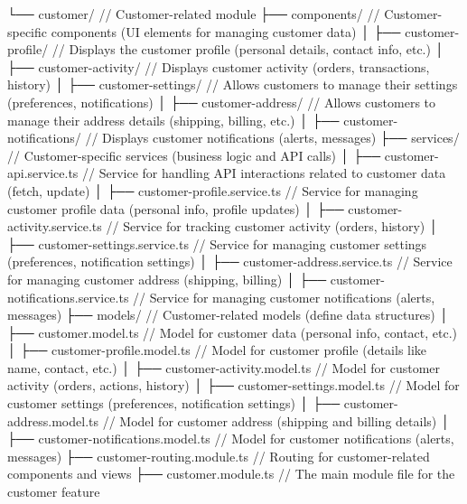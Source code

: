         └── customer/                            // Customer-related module
            ├── components/                       // Customer-specific components (UI elements for managing customer data)
            │   ├── customer-profile/             // Displays the customer profile (personal details, contact info, etc.)
            │   ├── customer-activity/            // Displays customer activity (orders, transactions, history)
            │   ├── customer-settings/            // Allows customers to manage their settings (preferences, notifications)
            │   ├── customer-address/             // Allows customers to manage their address details (shipping, billing, etc.)
            │   ├── customer-notifications/       // Displays customer notifications (alerts, messages)
            ├── services/                          // Customer-specific services (business logic and API calls)
            │   ├── customer-api.service.ts       // Service for handling API interactions related to customer data (fetch, update)
            │   ├── customer-profile.service.ts   // Service for managing customer profile data (personal info, profile updates)
            │   ├── customer-activity.service.ts  // Service for tracking customer activity (orders, history)
            │   ├── customer-settings.service.ts  // Service for managing customer settings (preferences, notification settings)
            │   ├── customer-address.service.ts   // Service for managing customer address (shipping, billing)
            │   ├── customer-notifications.service.ts // Service for managing customer notifications (alerts, messages)
            ├── models/                            // Customer-related models (define data structures)
            │   ├── customer.model.ts             // Model for customer data (personal info, contact, etc.)
            │   ├── customer-profile.model.ts     // Model for customer profile (details like name, contact, etc.)
            │   ├── customer-activity.model.ts    // Model for customer activity (orders, actions, history)
            │   ├── customer-settings.model.ts    // Model for customer settings (preferences, notification settings)
            │   ├── customer-address.model.ts     // Model for customer address (shipping and billing details)
            │   ├── customer-notifications.model.ts // Model for customer notifications (alerts, messages)
            ├── customer-routing.module.ts        // Routing for customer-related components and views
            ├── customer.module.ts                // The main module file for the customer feature

